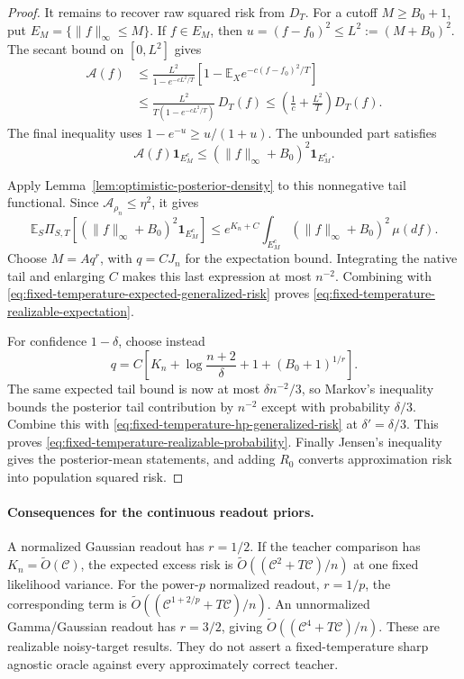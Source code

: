 \begin{proof}
It remains to recover raw squared risk from $D_T$. For a cutoff $M\ge B_0+1$, put $E_M=\{\|f\|_\infty\le M\}$. If $f\in E_M$, then $u=(f-f_0)^2\le L^2:=(M+B_0)^2$. The secant bound on $[0,L^2]$ gives
\begin{align*}
 \mathcal A(f)
 &\le\frac{L^2}{1-e^{-cL^2/T}}
           \left[1-\mathbb E_Xe^{-c(f-f_0)^2/T}\right]\\
 &\le\frac{L^2}{T(1-e^{-cL^2/T})}\,D_T(f)
 \le\left(\frac1c+\frac{L^2}T\right)D_T(f).
\end{align*}
The final inequality uses $1-e^{-u}\ge u/(1+u)$. The unbounded part satisfies
\[
 \mathcal A(f)\mathbf1_{E_M^c}
       \le(\|f\|_\infty+B_0)^2\mathbf1_{E_M^c}.
\]

Apply Lemma~\ref{lem:optimistic-posterior-density} to this nonnegative tail functional. Since $\mathcal A_{\rho_n}\le\eta^2$, it gives
\[
 \mathbb E_S\Pi_{S,T}
       [(\|f\|_\infty+B_0)^2\mathbf1_{E_M^c}]
 \le e^{K_n+C}\int_{E_M^c}(\|f\|_\infty+B_0)^2\,\mu(df).
\]
Choose $M=Aq^r$, with $q=CJ_n$ for the expectation bound. Integrating the native tail and enlarging $C$ makes this last expression at most $n^{-2}$. Combining with
\eqref{eq:fixed-temperature-expected-generalized-risk} proves
\eqref{eq:fixed-temperature-realizable-expectation}.

For confidence $1-\delta$, choose instead
\[
 q=C\left[K_n+\log\frac{n+2}{\delta}+1+(B_0+1)^{1/r}\right].
\]
The same expected tail bound is now at most $\delta n^{-2}/3$, so Markov's inequality bounds the posterior tail contribution by $n^{-2}$ except with probability $\delta/3$. Combine this with
\eqref{eq:fixed-temperature-hp-generalized-risk} at $\delta'=\delta/3$. This proves \eqref{eq:fixed-temperature-realizable-probability}. Finally Jensen's inequality gives the posterior-mean statements, and adding $R_0$ converts approximation risk into population squared risk.
\end{proof}

\paragraph{Consequences for the continuous readout priors.}
A normalized Gaussian readout has $r=1/2$. If the teacher comparison has $K_n=\widetilde O(\mathcal C)$, the expected excess risk is
$\widetilde O((\mathcal C^2+T\mathcal C)/n)$ at one fixed likelihood variance. For the power-$p$ normalized readout, $r=1/p$, the corresponding term is
$\widetilde O((\mathcal C^{1+2/p}+T\mathcal C)/n)$.
An unnormalized Gamma/Gaussian readout has $r=3/2$, giving
$\widetilde O((\mathcal C^4+T\mathcal C)/n)$.
These are realizable noisy-target results. They do not assert a fixed-temperature sharp agnostic oracle against every approximately correct teacher.
